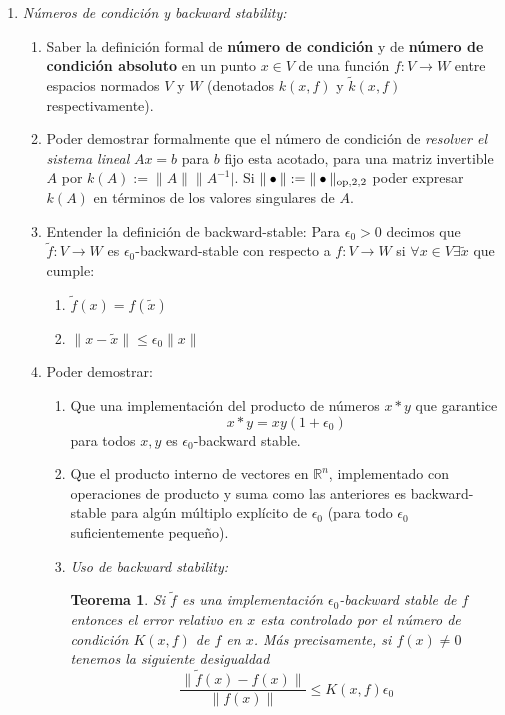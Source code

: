 \documentclass[12pt]{amsart}
\newtheorem{theorem}[lemma]{Teorema}
\theoremstyle{definition}
\renewcommand{\leq}{\leqslant}
\newcommand{\RR}{\ensuremath{\mathbb{R}}}
\begin{document}
\begin{enumerate}
\begin{enumerate}
\item Saber calcular $\|T\|_{\rm op,1,1}$, $\|T\|_{\rm op,\infty,\infty}$ en términos de las entradas de $T$ y expresar $\|T\|_{\rm op,2,2}$ en términos de valores singulares.  
\end{enumerate}


\item \emph{Números de condición y backward stability:}

\begin{enumerate}
\item Saber la definición formal de {\bf número de condición} y de {\bf número de condición absoluto} en un punto $x\in V$ de una función $f:V\rightarrow W$ entre espacios normados $V$ y $W$ (denotados $k(x,f)$ y $\tilde{k}(x,f)$ respectivamente).

\item Poder demostrar formalmente que el número de condición de {\it resolver el sistema lineal} $Ax=b$ para $b$ fijo esta acotado, para una matriz invertible $A$ por $k(A):=\|A\|\|A^{-1}|$. Si $\|\bullet\|:=\|\bullet\|_{\rm op,2,2}$ poder expresar $k(A)$ en términos de los valores singulares de $A$.

\item Entender la definición de backward-stable:
Para $\epsilon_0>0$ decimos que $\tilde{f}:V\rightarrow W$ es $\epsilon_0$-backward-stable con respecto a $f:V\rightarrow W$ si 
$\forall x\in V \exists \tilde{x}$ que cumple:
\begin{enumerate}
\item $\tilde{f}(x)=f(\tilde{x})$ 
\item $\|x-\tilde{x}\|\leq \epsilon_0\|x\|$
\end{enumerate}

\item Poder demostrar:
\begin{enumerate}
\item  Que una implementación del producto de números $x\ast y$ que garantice 
\[x\ast y = xy(1+\epsilon_0)\]
para todos $x,y$ es $\epsilon_0$-backward stable.
\item Que el producto interno de vectores en $\RR^n$, implementado con operaciones de producto y suma como las anteriores es backward-stable para algún múltiplo explícito de $\epsilon_0$ (para todo $\epsilon_0$ suficientemente pequeño). 

\item \emph{Uso de backward stability:}
\begin{theorem} Si $\tilde{f}$ es una implementación $\epsilon_0$-backward stable de $f$ entonces el error relativo en $x$ esta controlado por el número de condición $K(x,f)$  de $f$ en $x$. Más precisamente, si $f(x)\neq 0$ tenemos la siguiente desigualdad
\[\frac{\|\tilde{f}(x)-f(x)\|}{\|f(x)\|}\leq K(x,f)\epsilon_0\]
\end{theorem}


\end{enumerate}
\end{enumerate}
\end{enumerate}
\end{document}
